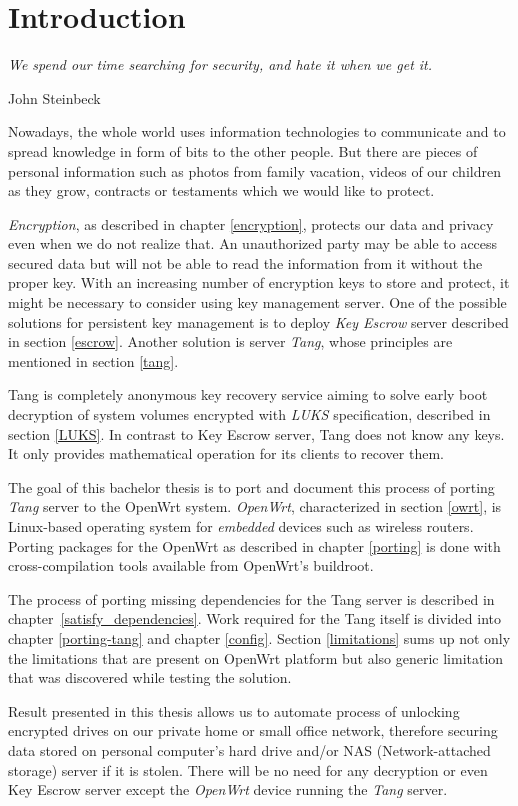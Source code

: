 \chapter{Introduction}\label{introduction}
\epigraph{\it We spend our time searching for security, and hate it when we get it.}{{John Steinbeck}\cite{quote}}

Nowadays, the whole world uses information technologies to communicate and to spread knowledge in form of bits to the other people.
But there are pieces of personal information such as photos from family vacation, videos of our children as they grow, contracts or testaments which we would like to protect.

{\it Encryption}, as described in chapter \ref{encryption}, protects our data and privacy even when we do not realize that.
An unauthorized party may be able to access secured data but will not be able to read the information from it without the proper key.
With an increasing number of encryption keys to store and protect, it might be necessary to consider using key management server.
One of the possible solutions for persistent key management is to deploy {\it Key Escrow} server described in section \ref{escrow}.
Another solution is server {\it Tang}, whose principles are mentioned in section \ref{tang}.

Tang is completely anonymous key recovery service aiming to solve early boot decryption of system volumes encrypted with {\it LUKS} specification, described in section \ref{LUKS}.
In contrast to Key Escrow server, Tang does not know any keys.
It only provides mathematical operation for its clients to recover them.

The goal of this bachelor thesis is to port and document this process of porting {\it Tang} server to the OpenWrt system.
{\it OpenWrt}, characterized in section \ref{owrt}, is Linux-based operating system for {\it embedded} devices such as wireless routers.
Porting packages for the OpenWrt as described in chapter \ref{porting} is done with cross-compilation tools available from OpenWrt's buildroot.

The process of porting missing dependencies for the Tang server is described in chapter~\ref{satisfy_dependencies}.
Work required for the Tang itself is divided into chapter \ref{porting-tang} and chapter \ref{config}.
Section \ref{limitations} sums up not only the limitations that are present on OpenWrt platform but also generic limitation that was discovered while testing the solution.

Result presented in this thesis allows us to automate process of unlocking encrypted drives on our private home or small office network, therefore securing data stored on personal computer's hard drive and/or NAS (Network-attached storage) server if it is stolen.
There will be no need for any decryption or even Key Escrow server except the {\it OpenWrt} device running the {\it Tang} server.
